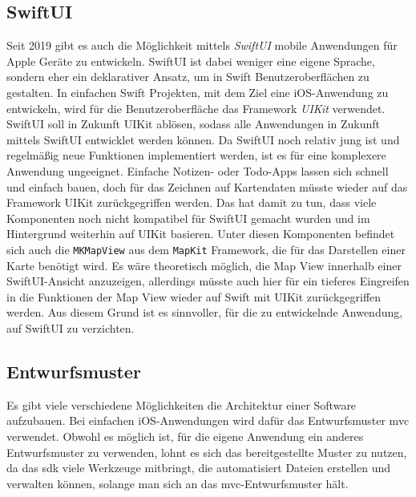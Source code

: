 \subsection{SwiftUI}
Seit 2019 gibt es auch die Möglichkeit mittels \textit{SwiftUI} mobile Anwendungen für Apple Geräte zu entwickeln.
SwiftUI ist dabei weniger eine eigene Sprache, sondern eher ein deklarativer Ansatz, um in Swift Benutzeroberflächen zu gestalten.
In einfachen Swift Projekten, mit dem Ziel eine iOS-Anwendung zu entwickeln, wird für die Benutzeroberfläche das Framework \textit{UIKit} verwendet.
SwiftUI soll in Zukunft UIKit ablösen, sodass alle Anwendungen in Zukunft mittels SwiftUI entwicklet werden können.\pbreak%
%
Da SwiftUI noch relativ jung ist und regelmäßig neue Funktionen implementiert werden, ist es für eine komplexere Anwendung ungeeignet.
Einfache Notizen- oder Todo-Apps lassen sich schnell und einfach bauen, doch für das Zeichnen auf Kartendaten müsste wieder auf das Framework UIKit zurückgegriffen werden.
Das hat damit zu tun, dass viele Komponenten noch nicht kompatibel für SwiftUI gemacht wurden und im Hintergrund weiterhin auf UIKit basieren.
Unter diesen Komponenten befindet sich auch die \texttt{MKMapView} aus dem \texttt{MapKit} Framework, die für das Darstellen einer Karte benötigt wird.
Es wäre theoretisch möglich, die Map View innerhalb einer SwiftUI-Ansicht anzuzeigen, allerdings müsste auch hier für ein tieferes Eingreifen in die Funktionen der Map View wieder auf Swift mit UIKit zurückgegriffen werden.
Aus diesem Grund ist es sinnvoller, für die zu entwickelnde Anwendung, auf SwiftUI zu verzichten.

\subsection{Entwurfsmuster}
Es gibt viele verschiedene Möglichkeiten die Architektur einer Software aufzubauen.
Bei einfachen iOS-Anwendungen wird dafür das Entwurfsmuster \ac{mvc} verwendet.
Obwohl es möglich ist, für die eigene Anwendung ein anderes Entwurfsmuster zu verwenden, lohnt es sich das bereitgestellte Muster zu nutzen, da das \Gls{sdk} viele Werkzeuge mitbringt, die automatisiert Dateien erstellen und verwalten können, solange man sich an das \ac{mvc}-Entwurfsmuster hält.
